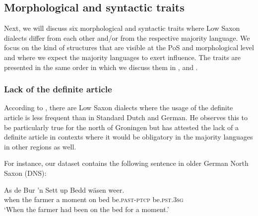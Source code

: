 \documentclass[output=paper,colorlinks,citecolor=brown]{langscibook}
\begin{document}
\subsection{Morphological and syntactic traits}
Next, we will discuss six %
morphological and syntactic traits where Low Saxon dialects differ from each other and/or from the respective majority language. We focus on the kind of structures that are visible at the PoS and morphological level and where we expect the majority languages to exert influence. %
The traits are presented in the same order in which we discuss them in ,  and .

\subsubsection{Lack of the definite article}\label{feature:lack-of-definite-article}

According to \citet{Pheiff2022}, there are Low Saxon dialects where the usage of the definite article is less frequent than in Standard Dutch and German. He observes this to be particularly true for the north of Groningen but has attested the lack of a definite article in contexts where it would be obligatory in the majority languages in other regions as well. 

For instance, our dataset contains the following sentence in older German North Saxon (DNS): 


\ea
\gll As de Bur 'n Sett up Bedd wäsen weer.\\
when the  farmer a moment on  bed be.\textsc{past-ptcp} be.\textsc{pst.3sg}\\
\glt `When the farmer had been on the bed for a moment.'
\z
\end{document}
